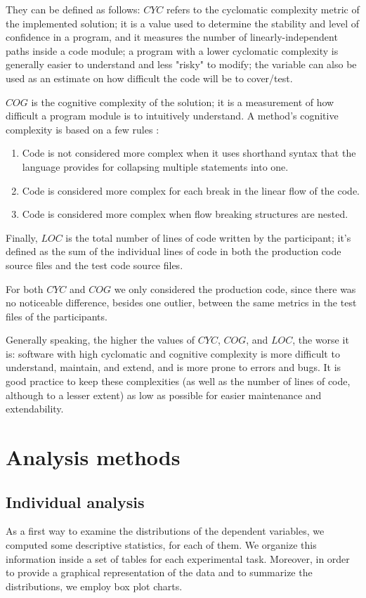 They can be defined as follows:
\textbf{$CYC$} refers to the cyclomatic complexity metric of the implemented solution; it is a value used to determine the stability and level of confidence in a program, and it measures the number of linearly-independent paths inside a code module; a program with a lower cyclomatic complexity is generally easier to understand and less "risky" to modify; the variable can also be used as an estimate on how difficult the code will be to cover/test.

\textbf{$COG$} is the cognitive complexity of the solution; it is a measurement of how difficult a program module is to intuitively understand. A method's cognitive complexity is based on a few rules \cite{CognitiveComplexity}:
\begin{enumerate}
    \item Code is not considered more complex when it uses shorthand syntax that the language provides for collapsing multiple statements into one.
    \item Code is considered more complex for each break in the linear flow of the code.
    \item Code is considered more complex when flow breaking structures are nested.
\end{enumerate}

Finally, $LOC$ is the total number of lines of code written by the participant; it's defined as the sum of the individual lines of code in both the production code source files and the test code source files.

For both $CYC$ and $COG$ we only considered the production code, since there was no noticeable difference, besides one outlier, between the same metrics in the test files of the participants.

Generally speaking, the higher the values of $CYC$, $COG$, and $LOC$, the worse it is: software with high cyclomatic and cognitive complexity is more difficult to understand, maintain, and extend, and is more prone to errors and bugs. It is good practice to keep these complexities (as well as the number of lines of code, although to a lesser extent) as low as possible for easier maintenance and extendability.





\section{Analysis methods}
\subsection{Individual analysis}
As a first way to examine the distributions of the dependent variables, we computed some descriptive statistics, for each of them. We organize this information inside a set of tables for each experimental task. Moreover, in order to provide a graphical representation of the data and to summarize the distributions, we employ box plot charts.

